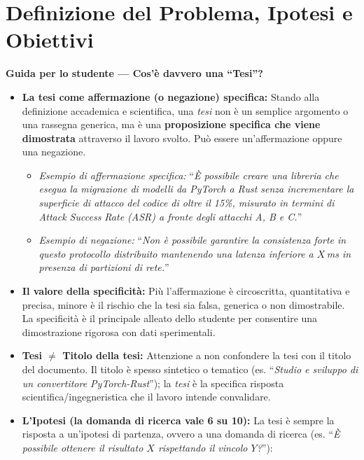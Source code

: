 \section{Definizione del Problema, Ipotesi e Obiettivi}
\label{sec:problema-obiettivi}

\textbf{Guida per lo studente — Cos'è davvero una ``Tesi''?}
\begin{itemize}
    \item \textbf{La tesi come affermazione (o negazione) specifica:} 
    Stando alla definizione accademica e scientifica, una \emph{tesi} non è un semplice argomento o una rassegna generica, ma è una \textbf{proposizione specifica che viene dimostrata} attraverso il lavoro svolto. Può essere un'affermazione oppure una negazione.
    \begin{itemize}
        \item \emph{Esempio di affermazione specifica:} ``\emph{È possibile creare una libreria che esegua la migrazione di modelli da PyTorch a Rust senza incrementare la superficie di attacco del codice di oltre il 15\%, misurato in termini di Attack Success Rate (ASR) a fronte degli attacchi A, B e C.}''
        \item \emph{Esempio di negazione:} ``\emph{Non è possibile garantire la consistenza forte in questo protocollo distribuito mantenendo una latenza inferiore a $X$\,ms in presenza di partizioni di rete.}''
    \end{itemize}
    \item \textbf{Il valore della specificità:} Più l'affermazione è circoscritta, quantitativa e precisa, minore è il rischio che la tesi sia falsa, generica o non dimostrabile. La specificità è il principale alleato dello studente per consentire una dimostrazione rigorosa con dati sperimentali.
    \item \textbf{Tesi $\neq$ Titolo della tesi:} Attenzione a non confondere la tesi con il titolo del documento. Il titolo è spesso sintetico o tematico (es. ``\emph{Studio e sviluppo di un convertitore PyTorch-Rust}''); la \emph{tesi} è la specifica risposta scientifica/ingegneristica che il lavoro intende convalidare.
    \item \textbf{L'Ipotesi (la domanda di ricerca vale 6 su 10):}
    La tesi è sempre la risposta a un'ipotesi di partenza, ovvero a una domanda di ricerca (es. ``\emph{È possibile ottenere il risultato $X$ rispettando il vincolo $Y$?}''):

\end{itemize}
